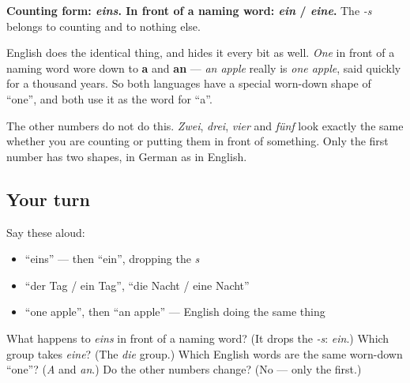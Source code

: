 \begin{grammarlens}[title={Grammar Lens: the counting -s drops}]
\textbf{Counting form: \emph{eins}. In front of a naming word: \emph{ein} / \emph{eine}.} The \emph{-s} belongs to counting and to nothing else.

English does the identical thing, and hides it every bit as well. \emph{One} in front of a naming word wore down to \textbf{a} and \textbf{an} — \emph{an apple} really is \emph{one apple}, said quickly for a thousand years. So both languages have a special worn-down shape of \textquotedblleft{}one\textquotedblright{}, and both use it as the word for \textquotedblleft{}a\textquotedblright{}.

The other numbers do not do this. \emph{Zwei}, \emph{drei}, \emph{vier} and \emph{fünf} look exactly the same whether you are counting or putting them in front of something. Only the first number has two shapes, in German as in English.
\end{grammarlens}

\subsection*{Your turn}
Say these aloud:

\begin{itemize}
\raggedright
  \item \textquotedblleft{}eins\textquotedblright{} — then \textquotedblleft{}ein\textquotedblright{}, dropping the \emph{s}
  \item \textquotedblleft{}der Tag / ein Tag\textquotedblright{}, \textquotedblleft{}die Nacht / eine Nacht\textquotedblright{}
  \item \textquotedblleft{}one apple\textquotedblright{}, then \textquotedblleft{}an apple\textquotedblright{} — English doing the same thing
\end{itemize}

\begin{tcolorbox}[breakable,colback=teal!4,colframe=teal!35!black,title={Before you move on}]
What happens to \emph{eins} in front of a naming word? (It drops the \emph{-s}: \emph{ein}.) Which group takes \emph{eine}? (The \emph{die} group.) Which English words are the same worn-down \textquotedblleft{}one\textquotedblright{}? (\emph{A} and \emph{an}.) Do the other numbers change? (No — only the first.)
\end{tcolorbox}
